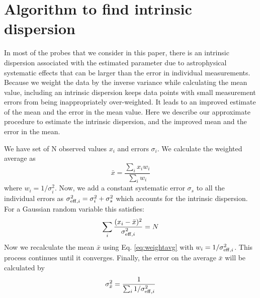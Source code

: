 \documentclass[useAMS,usenatbib,twocolumn]{mn2e}
\begin{document}







\clearpage

\appendix

\section{Algorithm to find intrinsic dispersion}
\label{ap:avg}

In most of the probes that we consider in this paper, there is an intrinsic
dispersion associated with the estimated parameter due to astrophysical
systematic effects that can be
larger than the error in individual measurements.
Because we weight the data by the inverse variance while calculating the
mean value, including an intrinsic dispersion keeps data points 
with small measurement errors from being inappropriately over-weighted. It 
leads to an improved  estimate of the mean and the error in the mean value.
 Here we describe our approximate procedure to estimate the intrinsic
dispersion,  and the improved mean and the error in the mean.


We have set of N observed values $x_i$ and errors $\sigma_i$. We calculate the
weighted average as 
\begin{equation}
 \bar{x} = \frac{\sum_i{x_i w_i}}{\sum_i{w_i}}
\label{eq:weightavg}
\end{equation}
where $w_i = 1/\sigma_i^2$. Now, we add a constant systematic error $\sigma_s$
to all the
individual errors as $\sigma_{{\rm eff},i}^2 = \sigma_i^2 + \sigma_s^2$ which
accounts for the intrinsic dispersion. 
For a Gaussian random variable this satisfies:
\begin{equation}
 \sum_i{\frac{(x_i - \bar{x})^2}{\sigma_{{\rm eff},i}^2}} = N
\end{equation}
Now we recalculate the mean $\bar{x}$ using Eq. \ref{eq:weightavg} with $w_i =
1/\sigma_{{\rm eff},i}^2$. This process continues until it converges. Finally, the
error on the average $\bar{x}$ will be calculated by
\begin{equation}
 \sigma_{\bar{x}}^2 = \frac{1}{\sum_i{1 / \sigma_{{\rm eff},i}^2}}
\end{equation}
\end{document}
